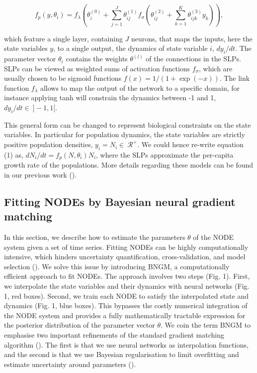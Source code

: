 \documentclass[11pt, oneside]{article}
\begin{document}
\vspace{-0.5cm}
\begin{equation}
    f_p \left(y, \theta_i \right) = f_\lambda \left( \theta_i^{(0)} + \sum_{j=1}^{J} \theta^{(1)}_{ij} f_\sigma \left( \theta^{(2)}_{ij} + \sum_{k=1}^{K} \theta^{(3)}_{ijk} y_k \right) \right),
\end{equation}

which feature a single layer, containing $J$ neurons, that maps the inputs, here the state variables $y$, to a single output, the dynamics of state variable $i$, $dy_i/dt$.
The parameter vector $\theta_i$ contains the weights $\theta^{(l)}$ of the connections in the SLPs.
SLPs can be viewed as weighted sums of activation functions $f_\sigma$, which are usually chosen to be sigmoid functions $f(x) = 1/(1+\exp(-x))$.
The link function $f_\lambda$ allows to map the output of the network to a specific domain, for instance applying tanh will constrain the dynamics between -1 and 1, $dy_i/dt \in~]-1,1[$. 

This general form can be changed to represent biological constraints on the state variables.
In particular for population dynamics, the state variables are strictly positive population densities, $y_i = N_i \in~\mathcal{R^+}$.
We could hence re-write equation (1) as, $dN_i/dt = f_p(N,\theta_i)N_i$, where the SLPs approximate the per-capita growth rate of the populations.
More details regarding these models can be found in our previous work (\cite{Bonnaffe2021a}).

\subsection{Fitting NODEs by Bayesian neural gradient matching}

In this section, we describe how to estimate the parameters $\theta$ of the NODE system given a set of time series. 
Fitting NODEs can be highly computationally intensive, which hinders uncertainty quantification, cross-validation, and model selection (\cite{Bonnaffe2021a}).
We solve this issue by introducing BNGM, a computationally efficient approach to fit NODEs.
The approach involves two steps (Fig. 1).
First, we interpolate the state variables and their dynamics with neural networks (Fig. 1, red boxes).
Second, we train each NODE to satisfy the interpolated state and dynamics (Fig. 1, blue boxes).
This bypasses the costly numerical integration of the NODE system and provides a fully mathematically tractable expression for the posterior distribution of the parameter vector $\theta$. 
We coin the term BNGM to emphasise two important refinements of the standard gradient matching algorithm (\cite{Ellner2002}). 
The first is that we use neural networks as interpolation functions, and the second is that we use Bayesian regularisation to limit overfitting and estimate uncertainty around parameters (\cite{Cawley2007}).
\end{document}
